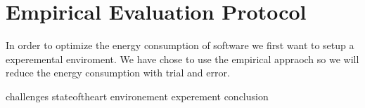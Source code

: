 \newpage

\chapter{Empirical Evaluation Protocol}
\label{chapter:testing}

In order to optimize the energy consumption of software we first want to setup a experemental enviroment. We have chose to use the empirical appraoch so we will reduce the energy consumption with trial and error.


{challenges}
{stateoftheart}
{environement}
{experement}
{conclusion}

